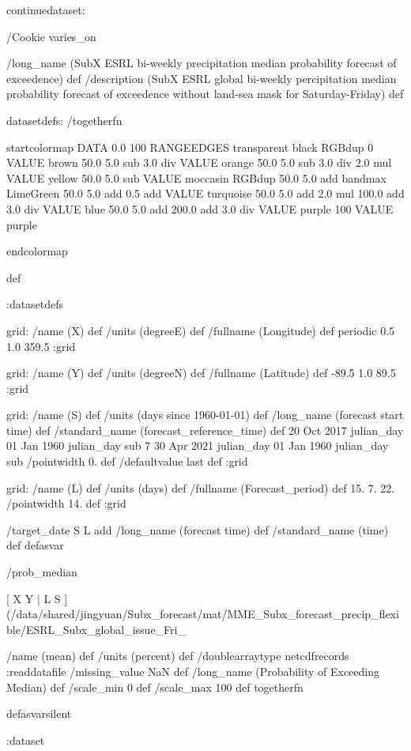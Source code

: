 \begin{ingrid}

continuedataset:


/Cookie varies_on


/long_name (SubX ESRL bi-weekly precipitation median probability forecast of exceedence) def
/description (SubX ESRL global bi-weekly percipitation median probability forecast of exceedence without land-sea mask for Saturday-Friday) def

datasetdefs:
/togetherfn {
startcolormap 
DATA 0.0 100 RANGEEDGES
     transparent black RGBdup
       0 VALUE
       brown 50.0
         5.0 sub
         3.0 div
         VALUE
         orange 50.0
          5.0 sub
          3.0 div
          2.0 mul
          VALUE
          yellow 50.0
           5.0 sub
           VALUE
          moccasin RGBdup 50.0
             5.0 add
             bandmax
             LimeGreen 50.0
              5.0 add
              0.5 add
              VALUE
              turquoise 50.0
               5.0 add
               2.0 mul
               100.0 add
               3.0 div
               VALUE
               blue 50.0
                5.0 add
                200.0 add
                3.0 div
                VALUE
               purple
                100 VALUE
                purple
   
endcolormap
} def 

:datasetdefs


grid:
/name (X) def
/units (degreeE) def
/fullname (Longitude) def
periodic
0.5 1.0 359.5
:grid

grid:
/name (Y) def
/units (degreeN) def
/fullname (Latitude) def
-89.5 1.0 89.5
:grid


grid:
/name (S) def
/units (days since 1960-01-01) def
/long_name (forecast start time) def
/standard_name (forecast_reference_time) def
20 Oct 2017 julian_day 01 Jan 1960 julian_day sub
7
30 Apr 2021 julian_day 01 Jan 1960 julian_day sub
/pointwidth 0. def
/defaultvalue { last } def
:grid

grid:
/name (L) def
/units (days) def
/fullname (Forecast_period) def
15. 7. 22.
/pointwidth 14. def
:grid


/target_date { S L add /long_name (forecast time) def /standard_name (time) def } defasvar

/prob_median {

[ X Y | L S ] (/data/shared/jingyuan/Subx_forecast/mat/MME_Subx_forecast_precip_flexible/ESRL_Subx_global_issue_Fri_%

/name (mean) def
/units (percent) def
/doublearraytype netcdfrecords :readdatafile
/missing_value NaN def
/long_name (Probability of Exceeding Median) def
/scale_min 0 def
/scale_max 100 def
togetherfn
} defasvarsilent


:dataset
\end{ingrid}
